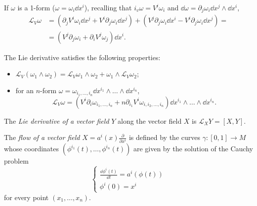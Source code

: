 \documentclass[a4paper,12pt]{book}
\begin{document}
\begin{example}
If $\omega$ is a 1-form ($\omega=\omega_i\dd x^i$), recalling that $i_v\omega=V^i\omega_i$ and $\dd\omega=\partial_j\omega_i\dd x^j\wedge\dd x^i$,
\begin{align*}
\mathcal L_V\omega&=(\partial_jV^i\omega_i\dd x^j+V^i\partial_j\omega_i\dd x^j)+(V^j\partial_j\omega_i\dd x^i-V^i\partial_j\omega_i\dd x^j)=\\
&=(V^j\partial_j\omega_i+\partial_iV^j\omega_j)\dd x^i.\end{align*}
\end{example}

The Lie derivative satisfies the following properties:
\begin{itemize}
\item \leavevmode\par\vspace*{\dimexpr-4pt-\parskip-\baselineskip}
\begin{exercise}$\mathcal L_V(\omega_1\wedge\omega_2)=\mathcal L_V\omega_1\wedge\omega_2+\omega_1\wedge\mathcal L_V\omega_2$;\end{exercise}
\item for an $n$-form $\omega=\omega_{i_1,\ldots,i_n}\dd x^{i_1}\wedge\ldots\wedge\dd x^{i_n}$,
\[\mathcal L_V\omega=(V^i\partial_i\omega_{i_1,\ldots,i_n}+n\partial_{i_1}V^i\omega_{i,i_2,\ldots,i_n})\dd x^{i_1}\wedge\ldots\wedge\dd x^{i_n}.\]
\end{itemize}

\begin{definition}
The \emph{Lie derivative of a vector field} $Y$ along the vector field $X$ is $\mathcal L_XY=[X,Y]$.
\end{definition}

\begin{definition}
The \emph{flow of a vector field} $X=a^i(x)\frac{\partial}{\partial x^i}$ is defined by the curves $\gamma\colon[0,1]\to M$ whose coordinates $(\phi^{i_1}(t),\ldots,\phi^{i_n}(t))$ are given by the solution of the Cauchy problem
\[\begin{cases}
\frac{\dd \phi^i(t)}{\dd t}=a^i(\phi(t))\\
\phi^i(0)=x^i
\end{cases}\]
for every point $(x_1,\ldots,x_n)$.
\end{definition}
\end{document}
